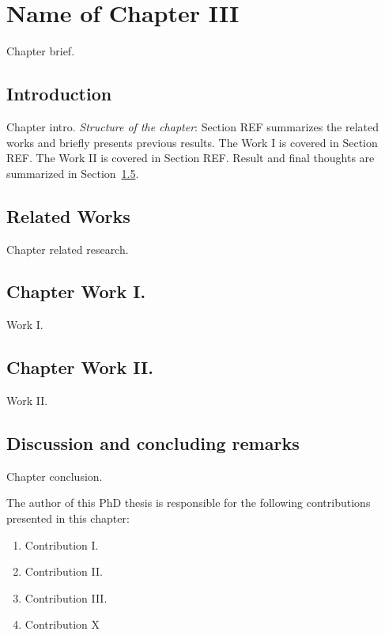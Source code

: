 \chapter{Name of Chapter III}
\label{chapter_3}

Chapter brief.

\section{Introduction}
Chapter intro.
\textit{Structure of the chapter}: Section REF summarizes the related works and briefly presents previous results. The Work I is covered in Section REF. The Work II is covered in Section REF. Result and final thoughts are summarized in Section~\ref{ch3:contrib}.
\section{Related Works}
Chapter related research.

\section{Chapter Work I.}
Work I. \cite{b:isis-floodrouting}
\section{Chapter Work II.}
Work II.
\section{Discussion and concluding remarks}
\label{ch3:contrib}

Chapter conclusion.

The author of this PhD thesis is responsible for the following contributions presented in this chapter:
\begin{enumerate}[wide = 0pt, widest = {II/5.}, leftmargin =*]
	\item[II/1.] Contribution I.
	
    \item[II/2.] Contribution II.
	
    \item[II/3.] Contribution III.
	
    \item[II/4.] Contribution X
\end{enumerate}